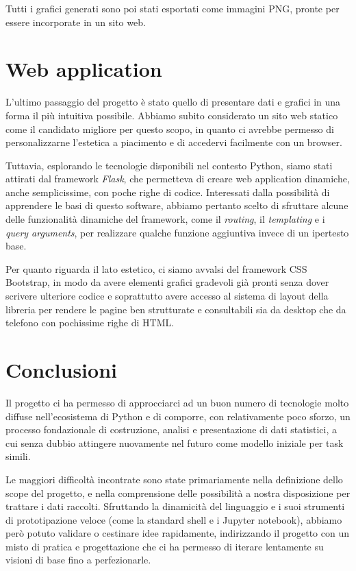 \documentclass[11pt]{article}
\begin{document}
Tutti i grafici generati sono poi stati esportati come immagini PNG, pronte per essere
incorporate in un sito web.

\section{Web application}
L'ultimo passaggio del progetto è stato quello di presentare dati e grafici in una forma
il più intuitiva possibile. Abbiamo subito considerato un sito web statico come il
candidato migliore per questo scopo, in quanto ci avrebbe permesso di personalizzarne 
l'estetica a piacimento e di accedervi facilmente con un browser.

Tuttavia, esplorando le tecnologie disponibili nel contesto Python, siamo stati attirati
dal framework \textit{Flask}, che permetteva di creare web application dinamiche, anche 
semplicissime, con poche righe di codice. Interessati dalla possibilità di apprendere
le basi di questo software, abbiamo pertanto scelto di sfruttare alcune delle funzionalità
dinamiche del framework, come il \textit{routing}, il \textit{templating} e i \textit{query
arguments}, per realizzare qualche funzione aggiuntiva invece di un ipertesto base.

Per quanto riguarda il lato estetico, ci siamo avvalsi del framework CSS Bootstrap, in modo
da avere elementi grafici gradevoli già pronti senza dover scrivere ulteriore codice e
soprattutto avere accesso al sistema di layout della libreria per rendere le pagine
ben strutturate e consultabili sia da desktop che da telefono con pochissime righe di HTML.

\section{Conclusioni}
Il progetto ci ha permesso di approcciarci ad un buon numero di tecnologie molto diffuse
nell'ecosistema di Python e di comporre, con relativamente poco sforzo, un processo 
fondazionale di costruzione, analisi e presentazione di dati statistici, a cui senza
dubbio attingere nuovamente nel futuro come modello iniziale per task simili.

Le maggiori difficoltà incontrate sono state primariamente nella definizione dello scope
del progetto, e nella comprensione delle possibilità a nostra disposizione per trattare i
dati raccolti. Sfruttando la dinamicità del linguaggio e i suoi strumenti di prototipazione
veloce (come la standard shell e i Jupyter notebook), abbiamo però potuto validare o
cestinare idee rapidamente, indirizzando il progetto con un misto di pratica e
progettazione che ci ha permesso di iterare lentamente su visioni di base fino a
perfezionarle.
\end{document}
